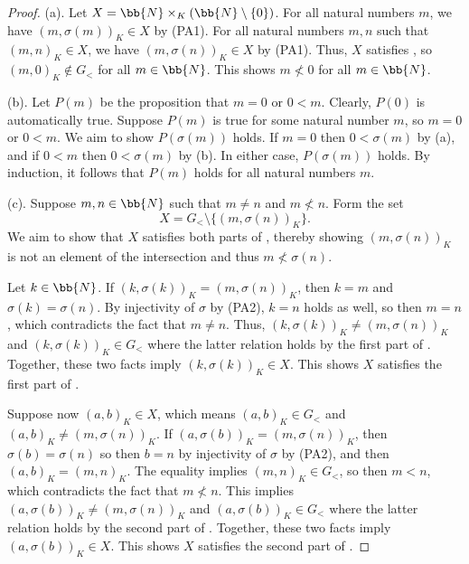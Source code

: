 \begin{proof}
	(a).
	Let $X = \bb{N}\times_{K} (\bb{N}\setminus\{0\})$. 
	For all natural numbers $m$, we have $(m, \sigma(m))_{K}\in X$ by (PA1). 
	For all natural numbers $m, n$ such that $(m, n)_{K}\in X$, we have $(m, \sigma(n))_{K}\in X$ by (PA1). 
	Thus, $X$ satisfies , so $(m, 0)_{K}\notin G_{<}$ for all $m\in\bb{N}$. 
	This shows $m\not < 0$ for all $m\in\bb{N}$. 
	
	(b).
	Let $P(m)$ be the proposition that $m = 0$ or $0 < m$. 
	Clearly, $P(0)$ is automatically true. 
	Suppose $P(m)$ is true for some natural number $m$, so $m = 0$ or $0 < m$. 
	We aim to show $P(\sigma(m))$ holds. 
	If $m = 0$ then $0 < \sigma(m)$ by  (a), and if $0 < m$ then $0 < \sigma(m)$ by  (b). 
	In either case, $P(\sigma(m))$ holds. 
	By induction, it follows that $P(m)$ holds for all natural numbers $m$.
	
	(c).
	Suppose $m, n\in\bb{N}$ such that $m\ne n$ and $m \not< n$. 
	Form the set 
	\[ X = G_{<}\setminus\{ (m, \sigma(n))_{K} \}. \]
	We aim to show that $X$ satisfies both parts of , thereby showing $(m, \sigma(n))_{K}$ is not an element of the intersection  and thus $m\not< \sigma(n)$. 
	
	Let $k\in\bb{N}$. 
	If $(k, \sigma(k))_{K} = (m, \sigma(n))_{K}$, then $k = m$ and $\sigma(k) = \sigma(n)$.
	By injectivity of $\sigma$ by (PA2), $k = n$ holds as well, so then $m = n$, which contradicts the fact that $m\ne n$. 
	Thus, $(k, \sigma(k))_{K}\ne (m, \sigma(n))_{K}$ and $(k, \sigma(k))_{K}\in G_{<}$ where the latter relation holds by the first part of . 
	Together, these two facts imply $(k, \sigma(k))_{K}\in X$.  
	This shows $X$ satisfies the first part of .
	
	Suppose now $(a, b)_{K}\in X$, which means $(a, b)_{K}\in G_{<}$ and $(a, b)_{K}\ne (m, \sigma(n))_{K}$. 
	If $(a, \sigma(b))_{K} = (m, \sigma(n))_{K}$, then $\sigma(b) = \sigma(n)$ so then $b = n$ by injectivity of $\sigma$ by (PA2), and then $(a, b)_{K} = (m, n)_{K}$.
	The equality implies $(m, n)_{K}\in G_{<}$, so then $m < n$, which contradicts the fact that $m\not< n$. 
	This implies $(a, \sigma(b))_{K}\ne (m, \sigma(n))_{K}$ and $(a, \sigma(b))_{K}\in G_{<}$ where the latter relation holds by the second part of .
	Together, these two facts imply $(a, \sigma(b))_{K}\in X$. 
	This shows $X$ satisfies the second part of .
	

\end{proof}
